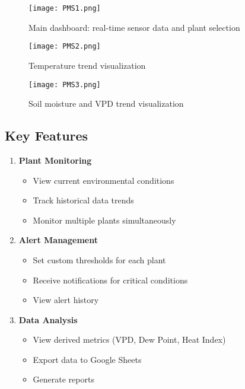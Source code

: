 \documentclass[12pt,a4paper]{article}
\begin{document}
\begin{figure}[h!]
    \centering
    \texttt{[image: PMS1.png]}
    \caption{Main dashboard: real-time sensor data and plant selection}
\end{figure}

\begin{figure}[h!]
    \centering
    \texttt{[image: PMS2.png]}
    \caption{Temperature trend visualization}
\end{figure}

\begin{figure}[h!]
    \centering
    \texttt{[image: PMS3.png]}
    \caption{Soil moisture and VPD trend visualization}
\end{figure}

\subsection{Key Features}
\begin{enumerate}[leftmargin=*]
    \item \textbf{Plant Monitoring}
    \begin{itemize}
        \item View current environmental conditions
        \item Track historical data trends
        \item Monitor multiple plants simultaneously
    \end{itemize}
    
    \item \textbf{Alert Management}
    \begin{itemize}
        \item Set custom thresholds for each plant
        \item Receive notifications for critical conditions
        \item View alert history
    \end{itemize}
    
    \item \textbf{Data Analysis}
    \begin{itemize}
        \item View derived metrics (VPD, Dew Point, Heat Index)
        \item Export data to Google Sheets
        \item Generate reports
    \end{itemize}
\end{enumerate}
\end{document}
